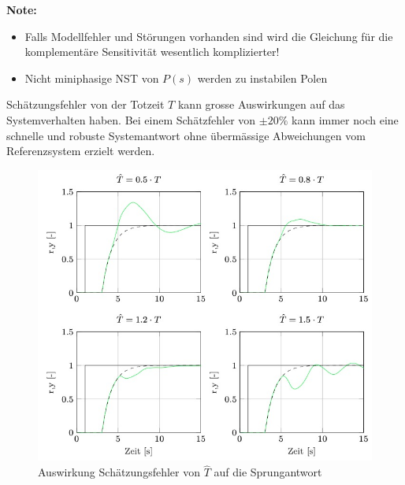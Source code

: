     \textbf{Note:} 
    \begin{itemize}
        \item Falls Modellfehler und Störungen vorhanden sind wird die Gleichung für die komplementäre Sensitivität wesentlich komplizierter!
        
        \item Nicht miniphasige NST von $P(s)$ werden zu instabilen Polen 
    \end{itemize}
    
    Schätzungsfehler von der Totzeit $T$ kann grosse Auswirkungen auf das Systemverhalten haben. Bei einem Schätzfehler von $\pm 20\%$ kann immer noch eine schnelle und robuste Systemantwort ohne übermässige Abweichungen vom Referenzsystem erzielt werden.
    \begin{figure}[H]
        \centering
        \includegraphics[width = 0.9\linewidth]{images/02/est_error_hat_T.jpg}
        \caption{Auswirkung Schätzungsfehler von $\hat{T}$ auf die Sprungantwort}
    \end{figure}
    
